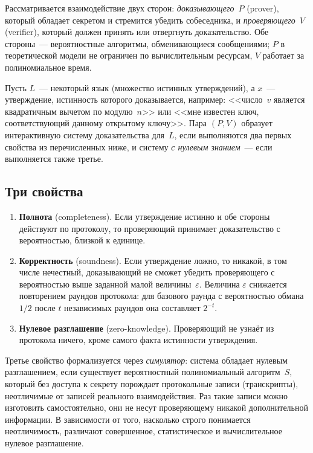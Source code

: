 \documentclass[14pt,a4paper]{extarticle}
\begin{document}
Рассматривается взаимодействие двух сторон: \emph{доказывающего}~$P$ (prover), который
обладает секретом и стремится убедить собеседника, и \emph{проверяющего}~$V$ (verifier),
который должен принять или отвергнуть доказательство. Обе стороны~--- вероятностные
алгоритмы, обменивающиеся сообщениями; $P$ в теоретической модели не ограничен по
вычислительным ресурсам, $V$ работает за полиномиальное время.

Пусть $L$~--- некоторый язык (множество истинных утверждений), а $x$~--- утверждение,
истинность которого доказывается, например: <<число~$v$ является квадратичным вычетом по
модулю~$n$>> или <<мне известен ключ, соответствующий данному открытому ключу>>. Пара
$(P, V)$ образует интерактивную систему доказательства для~$L$, если выполняются два
первых свойства из перечисленных ниже, и систему \emph{с нулевым знанием}~--- если
выполняется также третье.

\subsection{Три свойства}

\begin{enumerate}
\item \textbf{Полнота} (completeness). Если утверждение истинно и обе стороны действуют
по протоколу, то проверяющий принимает доказательство с вероятностью, близкой к единице.
\item \textbf{Корректность} (soundness). Если утверждение ложно, то никакой,
в том числе нечестный, доказывающий не сможет убедить проверяющего с вероятностью выше
заданной малой величины~$\varepsilon$. Величина $\varepsilon$ снижается повторением
раундов протокола: для базового раунда с вероятностью обмана~$1/2$ после $t$ независимых
раундов она составляет $2^{-t}$.
\item \textbf{Нулевое разглашение} (zero-knowledge). Проверяющий не узнаёт из протокола
ничего, кроме самого факта истинности утверждения.
\end{enumerate}

Третье свойство формализуется через \emph{симулятор}: система обладает нулевым
разглашением, если существует вероятностный полиномиальный алгоритм~$S$, который без
доступа к секрету порождает протокольные записи (транскрипты), неотличимые от
записей реального взаимодействия. Раз такие записи можно изготовить самостоятельно,
они не несут проверяющему никакой дополнительной информации. В зависимости от того,
насколько строго понимается неотличимость, различают совершенное, статистическое и
вычислительное нулевое разглашение.
\end{document}
